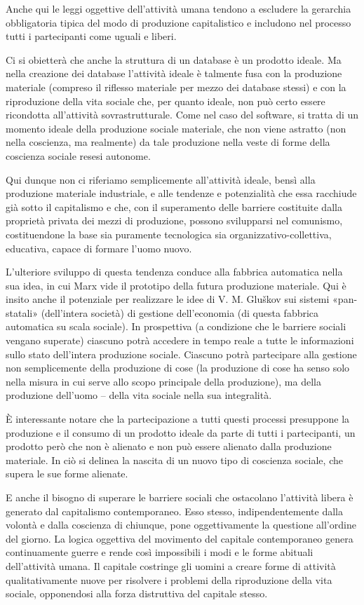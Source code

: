 \documentclass[../main]{subfiles}
\begin{document}
Anche qui le leggi oggettive dell'attività umana tendono a escludere la gerarchia obbligatoria tipica del modo di produzione capitalistico e includono nel processo tutti i partecipanti come uguali e liberi.

Ci si obietterà che anche la struttura di un database è un prodotto ideale. Ma nella creazione dei database l'attività ideale è talmente fusa con la produzione materiale (compreso il riflesso materiale per mezzo dei database stessi) e con la riproduzione della vita sociale che, per quanto ideale, non può certo essere ricondotta all'attività sovrastrutturale. Come nel caso del software, si tratta di un momento ideale della produzione sociale materiale, che non viene astratto (non nella coscienza, ma realmente) da tale produzione nella veste di forme della coscienza sociale resesi autonome.

Qui dunque non ci riferiamo semplicemente all'attività ideale, bensì alla produzione materiale industriale, e alle tendenze e potenzialità che essa racchiude già sotto il capitalismo e che, con il superamento delle barriere costituite dalla proprietà privata dei mezzi di produzione, possono svilupparsi nel comunismo, costituendone la base sia puramente tecnologica sia organizzativo-collettiva, educativa, capace di formare l'uomo nuovo.

L'ulteriore sviluppo di questa tendenza conduce alla fabbrica automatica nella sua idea, in cui Marx vide il prototipo della futura produzione materiale. Qui è insito anche il potenziale per realizzare le idee di V. M. Gluškov sui sistemi «pan-statali» (dell'intera società) di gestione dell'economia (di questa fabbrica automatica su scala sociale). In prospettiva (a condizione che le barriere sociali vengano superate) ciascuno potrà accedere in tempo reale a tutte le informazioni sullo stato dell'intera produzione sociale. Ciascuno potrà partecipare alla gestione non semplicemente della produzione di cose (la produzione di cose ha senso solo nella misura in cui serve allo scopo principale della produzione), ma della produzione dell'uomo – della vita sociale nella sua integralità.

È interessante notare che la partecipazione a tutti questi processi presuppone la produzione e il consumo di un prodotto ideale da parte di tutti i partecipanti, un prodotto però che non è alienato e non può essere alienato dalla produzione materiale. In ciò si delinea la nascita di un nuovo tipo di coscienza sociale, che supera le sue forme alienate.

E anche il bisogno di superare le barriere sociali che ostacolano l'attività libera è generato dal capitalismo contemporaneo. Esso stesso, indipendentemente dalla volontà e dalla coscienza di chiunque, pone oggettivamente la questione all'ordine del giorno. La logica oggettiva del movimento del capitale contemporaneo genera continuamente guerre e rende così impossibili i modi e le forme abituali dell'attività umana. Il capitale costringe gli uomini a creare forme di attività qualitativamente nuove per risolvere i problemi della riproduzione della vita sociale, opponendosi alla forza distruttiva del capitale stesso.
\end{document}
